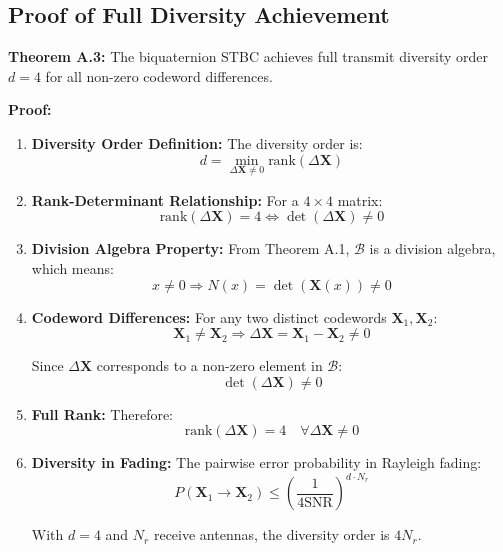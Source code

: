 \subsection{Proof of Full Diversity Achievement}

\textbf{Theorem A.3:} The biquaternion STBC achieves full transmit diversity order $d = 4$ for all non-zero codeword differences.

\textbf{Proof:}

\begin{enumerate}
    \item \textbf{Diversity Order Definition:} The diversity order is:
    \begin{equation}
    d = \min_{\Delta\mathbf{X} \neq 0} \text{rank}(\Delta\mathbf{X})
    \end{equation}
    
    \item \textbf{Rank-Determinant Relationship:} For a $4 \times 4$ matrix:
    \begin{equation}
    \text{rank}(\Delta\mathbf{X}) = 4 \iff \det(\Delta\mathbf{X}) \neq 0
    \end{equation}
    
    \item \textbf{Division Algebra Property:} From Theorem A.1, $\mathcal{B}$ is a division algebra, which means:
    \begin{equation}
    x \neq 0 \Rightarrow N(x) = \det(\mathbf{X}(x)) \neq 0
    \end{equation}
    
    \item \textbf{Codeword Differences:} For any two distinct codewords $\mathbf{X}_1, \mathbf{X}_2$:
    \begin{equation}
    \mathbf{X}_1 \neq \mathbf{X}_2 \Rightarrow \Delta\mathbf{X} = \mathbf{X}_1 - \mathbf{X}_2 \neq 0
    \end{equation}
    
    Since $\Delta\mathbf{X}$ corresponds to a non-zero element in $\mathcal{B}$:
    \begin{equation}
    \det(\Delta\mathbf{X}) \neq 0
    \end{equation}
    
    \item \textbf{Full Rank:} Therefore:
    \begin{equation}
    \text{rank}(\Delta\mathbf{X}) = 4 \quad \forall \Delta\mathbf{X} \neq 0
    \end{equation}
    
    \item \textbf{Diversity in Fading:} The pairwise error probability in Rayleigh fading:
    \begin{equation}
    P(\mathbf{X}_1 \to \mathbf{X}_2) \leq \left(\frac{1}{4\text{SNR}}\right)^{d \cdot N_r}
    \end{equation}
    
    With $d = 4$ and $N_r$ receive antennas, the diversity order is $4N_r$.
\end{enumerate}

